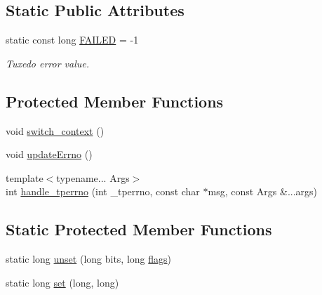 \subsection*{Static Public Attributes}
\begin{DoxyCompactItemize}
\item 
\hypertarget{classatmi_1_1tuxedo_a79d8805a077e30138729f44c75fcfa5d}{static const long \hyperlink{classatmi_1_1tuxedo_a79d8805a077e30138729f44c75fcfa5d}{F\+A\+I\+L\+E\+D} = -\/1}\label{classatmi_1_1tuxedo_a79d8805a077e30138729f44c75fcfa5d}

\begin{DoxyCompactList}\small\item\em Tuxedo error value. \end{DoxyCompactList}\end{DoxyCompactItemize}
\subsection*{Protected Member Functions}
\begin{DoxyCompactItemize}
\item 
void \hyperlink{classatmi_1_1tuxedo_a90d83b2141d484744a82202f3f66a939}{switch\+\_\+context} ()
\item 
void \hyperlink{classatmi_1_1tuxedo_a1c1d7f2df43e4357788d03977548ac2e}{update\+Errno} ()
\item 
{\footnotesize template$<$typename... Args$>$ }\\int \hyperlink{classatmi_1_1tuxedo_ae8715aedf9c8f3178aec71e93ee35be4}{handle\+\_\+tperrno} (int \+\_\+tperrno, const char $\ast$msg, const Args \&...args)
\end{DoxyCompactItemize}
\subsection*{Static Protected Member Functions}
\begin{DoxyCompactItemize}
\item 
static long \hyperlink{classatmi_1_1tuxedo_af962caf2ded45e192ba6a37740b133d0}{unset} (long bits, long \hyperlink{classatmi_1_1tuxedo_adfebbea0b6599ba8ca87743c55157b82}{flags})
\item 
static long \hyperlink{classatmi_1_1tuxedo_a73c4c95f165a052ba5a3a29cb2834831}{set} (long, long)
\end{DoxyCompactItemize}
